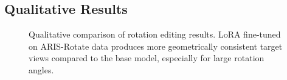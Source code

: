 \subsection{Qualitative Results}
\label{sec:exp:qual}

\begin{figure}[t]
  \centering
  \caption{
    Qualitative comparison of rotation editing results.
    LoRA fine-tuned on ARIS-Rotate data produces more geometrically consistent
    target views compared to the base model, especially for large rotation angles.
  }
  \label{fig:qual_lora}
\end{figure}
